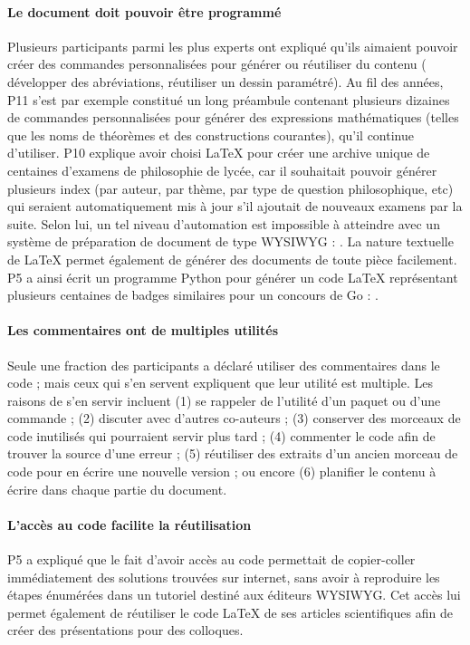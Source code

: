 \paragraph{Le document doit pouvoir être programmé}
Plusieurs participants parmi les plus experts ont expliqué qu'ils aimaient pouvoir créer des commandes personnalisées pour générer ou réutiliser du contenu (\eg{} développer des abréviations, réutiliser un dessin paramétré).
Au fil des années, P11 s'est par exemple constitué un long préambule contenant plusieurs dizaines de commandes personnalisées pour générer des expressions mathématiques (telles que les noms de théorèmes et des constructions courantes), qu'il continue d'utiliser.
P10 explique avoir choisi \LaTeX{} pour créer une archive unique de centaines d'examens de philosophie de lycée, car il souhaitait pouvoir générer plusieurs index (par auteur, par thème, par type de question philosophique, etc) qui seraient automatiquement mis à jour s'il ajoutait de nouveaux examens par la suite.
Selon lui, un tel niveau d'automation est impossible à atteindre avec un système de préparation de document de type WYSIWYG : .
La nature textuelle de \LaTeX{} permet également de générer des documents de toute pièce facilement.
P5 a ainsi écrit un programme Python pour générer un code \LaTeX{} représentant plusieurs centaines de badges similaires pour un concours de Go : .

\paragraph{Les commentaires ont de multiples utilités}
Seule une fraction des participants a déclaré utiliser des commentaires dans le code ; mais ceux qui s'en servent expliquent que leur utilité est multiple.
Les raisons de s'en servir incluent
(1) se rappeler de l'utilité d'un paquet ou d'une commande ;
(2) discuter avec d'autres co-auteurs ;
(3) conserver des morceaux de code inutilisés qui pourraient servir plus tard ;
(4) commenter le code afin de trouver la source d'une erreur ;
(5) réutiliser des extraits d'un ancien morceau de code pour en écrire une nouvelle version ;
ou encore (6) planifier le contenu à écrire dans chaque partie du document.

\paragraph{L'accès au code facilite la réutilisation}
P5 a expliqué que le fait d'avoir accès au code permettait de copier-coller immédiatement des solutions trouvées sur internet, sans avoir à reproduire les étapes énumérées dans un tutoriel destiné aux éditeurs WYSIWYG.
Cet accès lui permet également de réutiliser le code \LaTeX{} de ses articles scientifiques afin de créer des présentations pour des colloques.




